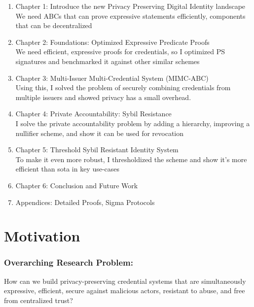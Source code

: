 
\begin{enumerate}
    \item Chapter 1: Introduce the new Privacy Preserving Digital Identity landscape \\
    We need ABCs that can prove expressive statements efficiently, components that can be decentralized

    \item Chapter 2: Foundations: Optimized Expressive Predicate Proofs \\
    We need efficient, expressive proofs for credentials, so I optimized PS signatures and benchmarked it against other similar schemes

    \item Chapter 3: Multi-Issuer Multi-Credential System (MIMC-ABC) \\
    Using this, I solved the problem of securely combining credentials from multiple issuers and showed privacy has a small overhead.

    \item Chapter 4: Private Accountability: Sybil Resistance \\
    I solve the private accountability problem by adding a hierarchy, improving a nullifier scheme, and show it can be used for revocation

    \item Chapter 5: Threshold Sybil Resistant Identity System \\
    To make it even more robust, I thresholdized the scheme and show it's more efficient than sota in key use-cases

    \item Chapter 6: Conclusion and Future Work

    \item Appendices: Detailed Proofs, Sigma Protocols
    
\end{enumerate}



\newpage
\section{Motivation}
\subsubsection*{Overarching Research Problem: }
How can we build privacy-preserving credential systems that are simultaneously expressive, efficient, secure against malicious actors, resistant to abuse, and free from centralized trust?



